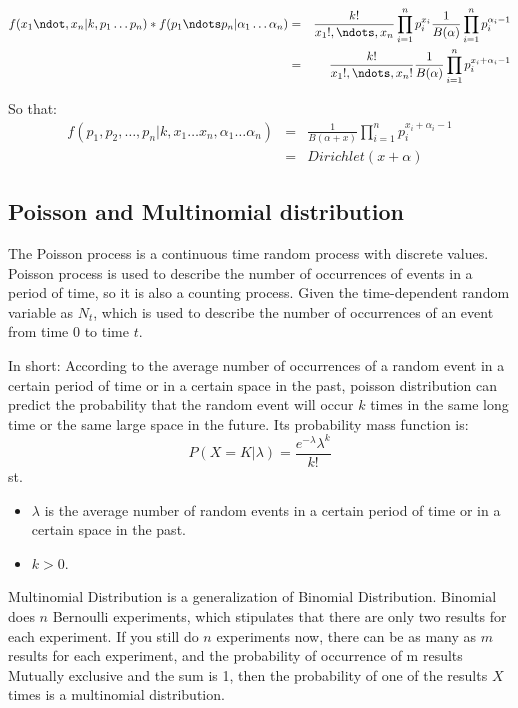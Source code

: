 \begin{eqnarray*}
  f(x_1\ndot,x_n|k,p_1\dots p_n)*f(p_1 \ndots p_n|\alpha_1 \dots \alpha_n) &=& \frac{k!}{x_1!,\ndots,x_n} \prod_{i=1}^n p_i^{x_i} \frac{1}{B(\alpha)} \prod_{i=1}^n p_i^{\alpha_i-1} \\
  &=& \frac{k!}{x_1!,\ndots,x_n!}  \frac{1}{B(\alpha)} \prod_{i=1}^n p_i^{x_i + \alpha_i-1} \\
\end{eqnarray*}

So that:
\begin{eqnarray*}
f(p_1,p_2,\dots,p_n|k,x_1 \dots x_n,\alpha_1 \dots \alpha_n) &=& \frac{1}{B(\alpha + x)} \prod_{i=1}^n p_i^{x_i + \alpha_i-1}\\
  &=& Dirichlet(x + \alpha)
\end{eqnarray*}







\subsection{Poisson and Multinomial distribution}

The Poisson process is a continuous time random process with discrete values. Poisson process is used to describe the number of occurrences of events in a period of time, so it is also a counting process. Given the time-dependent random variable as $N_t$, which is used to describe the number of occurrences of an event from time 0 to time $t$.


In short: According to the average number of occurrences of a random event in a certain period of time or in a certain space in the past, poisson distribution can predict the probability that the random event will occur $k$ times in the same long time or the same large space in the future. Its probability mass function is:
\[
  P(X=K|\lambda) = \frac{e^{-\lambda} \lambda^k}{k!}
\]
st.
\begin{itemize}
  \item
$\lambda$ is the average number of random events in a certain period of time or in a certain space in the past.
\item$ k>0$.
\end{itemize}


Multinomial Distribution is a generalization of Binomial Distribution. Binomial does $n$ Bernoulli experiments, which stipulates that there are only two results for each experiment. If you still do $n$ experiments now, there can be as many as $m$ results for each experiment, and the probability of occurrence of m results Mutually exclusive and the sum is 1, then the probability of one of the results $X$ times is a multinomial distribution.

